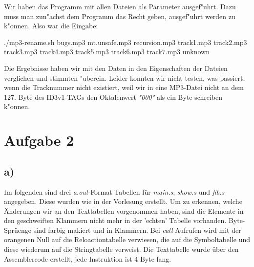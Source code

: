 \documentclass{ti2}
\begin{document}
Wir haben das Programm mit allen Dateien als Parameter ausgef"uhrt. Dazu muss man zun"achst dem Programm das Recht geben, ausgef"uhrt werden zu k"onnen. Also war die Eingabe:
\begin{listing}{0}
./mp3-rename.sh bugs.mp3 mt.unsafe.mp3 recursion.mp3 track1.mp3 track2.mp3
 track3.mp3 track4.mp3 track5.mp3 track6.mp3 track7.mp3 unknown
\end{listing}
Die Ergebnisse haben wir mit den Daten in den Eigenschaften der Dateien verglichen und stimmten "uberein. Leider konnten wir nicht testen, was passiert, wenn die Tracknummer nicht existiert, weil wir in eine MP3-Datei nicht an dem 127. Byte des ID3v1-TAGs den Oktalenwert \emph{"000"} als ein Byte schreiben k"onnen.
\section*{Aufgabe 2}
\subsection*{a)}
Im folgenden sind drei \emph{a.out}-Format Tabellen f\"ur \emph{main.s}, \emph{show.s} und \emph{fib.s} angegeben. Diese wurden wie in der Vorlesung erstellt. Um zu erkennen, welche \"Anderungen wir an den Texttabellen vorgenommen haben, sind die Elemente in den geschweiften Klammern nicht mehr in der 'echten' Tabelle vorhanden. Byte-Spr\"uenge sind farbig makiert und in Klammern. Bei \emph{call} Aufrufen wird mit der orangenen Null auf die Reloactiontabelle verwiesen, die auf die Symboltabelle und diese wiederum auf die  Stringtabelle verweist. Die Texttabelle wurde \"uber den Assemblercode erstellt, jede Instruktion ist 4 Byte lang.
\end{document}
